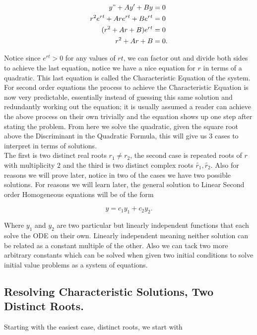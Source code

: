 \documentclass[12pt]{article}
\begin{document}
\begin{align*}
    y" + Ay' + By &= 0 \\
    r^2e^{rt} + Are^{rt} + Be^{rt} &= 0 \\
    (r^2 + Ar + B)e^{rt} &= 0 \\
    r^2 + Ar + B &= 0.  
\end{align*}

Notice since $e^{rt}>0$ for any values of $rt$, we can factor out and divide both sides to achieve the last equation, notice we have a nice equation for $r$ in terms of a quadratic. This last equation is called the Characteristic Equation of the system. For second order equations the process to achieve the Characteristic Equation is now very predictable, essentially instead of guessing this same solution and redundantly working out the equation; it is usually assumed a reader can achieve the above process on their own trivially and the equation shows up one step after stating the problem. From here we solve the quadratic, given the square root above the Discriminant in the Quadratic Formula, this will give us 3 cases to interpret in terms of solutions. \\

The first is two distinct real roots $r_1 \neq r_2$, the second case is repeated roots of $r$ with multiplicity $2$ and the third is two distinct complex roots $\tilde{r_1}, \tilde{r_2}$. Also for reasons we will prove later, notice in two of the cases we have two possible solutions. For reasons we will learn later, the general solution to Linear Second order Homogeneous equations will be of the form

\begin{equation*}
    y=c_1y_1+c_2y_2.
\end{equation*}

Where $y_1$ and $y_2$ are two particular but linearly independent functions that each solve the ODE on their own. Linearly independent meaning neither solution can be related as a constant multiple of the other. Also we can tack two more arbitrary constants which can be solved when given two initial conditions to solve initial value problems as a system of equations.

\subsection{Resolving Characteristic Solutions, Two Distinct Roots.}

Starting with the easiest case, distinct roots, we start with 
\end{document}
